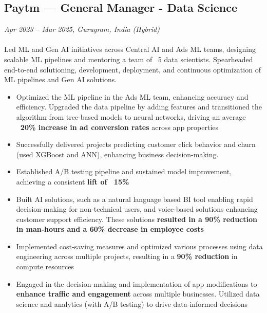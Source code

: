 \subsection*{Paytm — General Manager - Data Science}
\textit{Apr 2023 – Mar 2025, Gurugram, India (Hybrid)}
\\
\\
Led ML and Gen AI initiatives across Central AI and Ads ML teams, designing scalable ML pipelines and mentoring a team of ~5 data scientists. Spearheaded end-to-end solutioning, development, deployment, and continuous optimization of ML pipelines and Gen AI solutions.
\begin{itemize}[leftmargin=1em]
    \item Optimized the ML pipeline in the Ads ML team, enhancing accuracy and efficiency. Upgraded the data pipeline by adding features and transitioned the algorithm from tree-based models to neural networks, driving an average \textbf{~20\% increase in ad conversion rates} across app properties
    \item Successfully delivered projects predicting customer click behavior and churn (used XGBoost and ANN), enhancing business decision-making.
    \item Established A/B testing pipeline and sustained model improvement, achieving a consistent \textbf{lift of ~15\%}
    \item Built AI solutions, such as a natural language based BI tool enabling rapid decision-making for non-technical users, and voice-based solutions enhancing customer support efficiency. These solutions \textbf{resulted in a 90\% reduction in man-hours and a 60\% decrease in employee costs}
    \item Implemented cost-saving measures and optimized various processes using data engineering across multiple projects, resulting in a \textbf{90\% reduction} in compute resources
    \item Engaged in the decision-making and implementation of app modifications to \textbf{enhance traffic and engagement} across multiple businesses. Utilized data science and analytics (with A/B testing) to drive data-informed decisions
\end{itemize}

